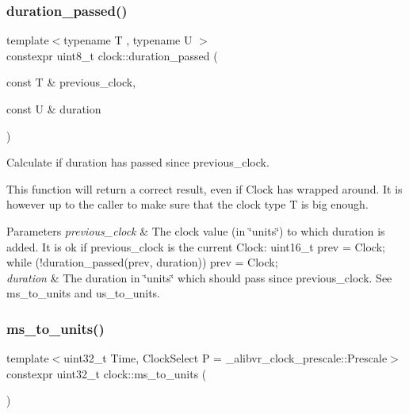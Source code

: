 \subsubsection{\texorpdfstring{duration\+\_\+passed()}{duration\_passed()}\hspace{0.1cm}{\footnotesize\ttfamily [2/2]}}
{\footnotesize\ttfamily template$<$typename T , typename U $>$ \\
constexpr uint8\+\_\+t clock\+::duration\+\_\+passed (\begin{DoxyParamCaption}\item[{const T \&}]{previous\+\_\+clock,  }\item[{const U \&}]{duration }\end{DoxyParamCaption})\hspace{0.3cm}{\ttfamily [inline]}}



Calculate if duration has passed since previous\+\_\+clock. 

This function will return a correct result, even if Clock has wrapped around. It is however up to the caller to make sure that the clock type T is big enough.


\begin{DoxyParams}{Parameters}
{\em previous\+\_\+clock} & The clock value (in \char`\"{}units\char`\"{}) to which duration is added. It is ok if previous\+\_\+clock is the current Clock\+: {\ttfamily uint16\+\_\+t prev = Clock; while (!duration\+\_\+passed(prev, duration)) prev = Clock;} \\
\hline
{\em duration} & The duration in \char`\"{}units\char`\"{} which should pass since previous\+\_\+clock. See ms\+\_\+to\+\_\+units and us\+\_\+to\+\_\+units. \\
\hline
\end{DoxyParams}
\hypertarget{namespaceclock_ae159a2e83f7b30eeafe3d5be8a3f5ef6}{}\label{namespaceclock_ae159a2e83f7b30eeafe3d5be8a3f5ef6} 
\subsubsection{\texorpdfstring{ms\+\_\+to\+\_\+units()}{ms\_to\_units()}}
{\footnotesize\ttfamily template$<$uint32\+\_\+t Time, Clock\+Select P = \+\_\+alibvr\+\_\+clock\+\_\+prescale\+::\+Prescale$>$ \\
constexpr uint32\+\_\+t clock\+::ms\+\_\+to\+\_\+units (\begin{DoxyParamCaption}{ }\end{DoxyParamCaption})\hspace{0.3cm}{\ttfamily [inline]}}



